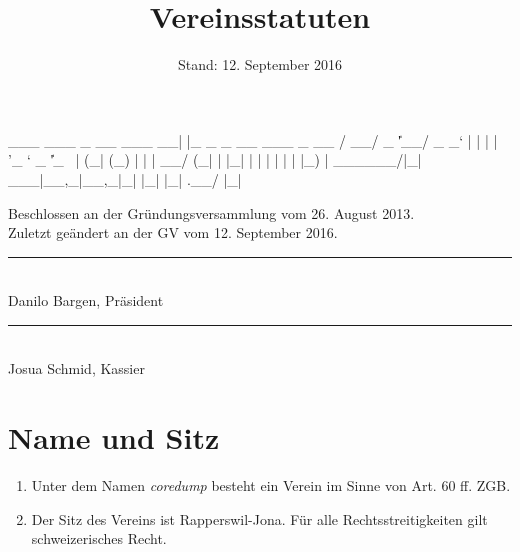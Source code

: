\documentclass[10pt,a4paper,parskip,fleqn]{scrartcl}
\title{\Huge Vereinsstatuten}
\date{Stand: 12. September 2016}
\newcommand{\ol}{\begin{enumerate}[itemsep=-0.2em,topsep=-0.2em]}
\newcommand{\lo}{\end{enumerate}}
\newcommand{\li}{\item}
\begin{document}
\begin{verbbox}
  ___ ___  _ __ ___  __| |_   _ _ __ ___  _ __  
 / __/ _ \| '__/ _ \/ _` | | | | '_ ` _ \| '_ \ 
| (_| (_) | | |  __/ (_| | |_| | | | | | | |_) |
 \___\___/|_|  \___|\__,_|\__,_|_| |_| |_| .__/ 
                                         |_|    
\end{verbbox}

\begin{titlepage}

	\maketitle
	\thispagestyle{empty} %

  \begin{center}

		\vspace{1cm}

		\theverbbox

		\vfill

		\large Beschlossen an der Gründungsversammlung vom 26. August 2013.\\
		\vspace{1em}
		\large Zuletzt geändert an der GV vom 12. September 2016.

		\vspace{1.5cm}

		\begin{minipage}[t]{0.49\textwidth}
			\center
			\rule{5cm}{0.2mm}\\
			Danilo Bargen, Präsident
		\end{minipage}
		\begin{minipage}[t]{0.49\textwidth}
			\center
			\rule{5cm}{0.2mm}\\
			Josua Schmid, Kassier
		\end{minipage}

  \end{center}

\end{titlepage}


\section{Name und Sitz}

\ol
	\li Unter dem Namen \textit{coredump} besteht ein Verein im Sinne von Art. 60
	ff. ZGB.
	\li Der Sitz des Vereins ist Rapperswil-Jona. Für alle Rechtsstreitigkeiten
	gilt schweizerisches Recht.
\lo
\end{document}
